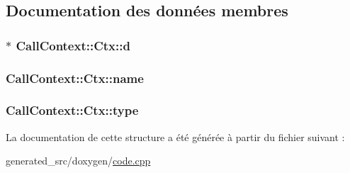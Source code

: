 \subsection{Documentation des données membres}
\hypertarget{struct_call_context_1_1_ctx_aa400baafdc56c3d1f6aad8bbf8baceab}{}
\subsubsection[{d}]{$\ast$ Call\+Context\+::\+Ctx\+::d}\label{struct_call_context_1_1_ctx_aa400baafdc56c3d1f6aad8bbf8baceab}
\hypertarget{struct_call_context_1_1_ctx_a25706b50d9a1377bc3c8d955047ad4fc}{}
\subsubsection[{name}]{ Call\+Context\+::\+Ctx\+::name}\label{struct_call_context_1_1_ctx_a25706b50d9a1377bc3c8d955047ad4fc}
\hypertarget{struct_call_context_1_1_ctx_a4f7150e244df309082ff5cc1abb0806f}{}
\subsubsection[{type}]{ Call\+Context\+::\+Ctx\+::type}\label{struct_call_context_1_1_ctx_a4f7150e244df309082ff5cc1abb0806f}


La documentation de cette structure a été générée à partir du fichier suivant \+:\begin{DoxyCompactItemize}
\item 
generated\+\_\+src/doxygen/\hyperlink{code_8cpp}{code.\+cpp}\end{DoxyCompactItemize}
